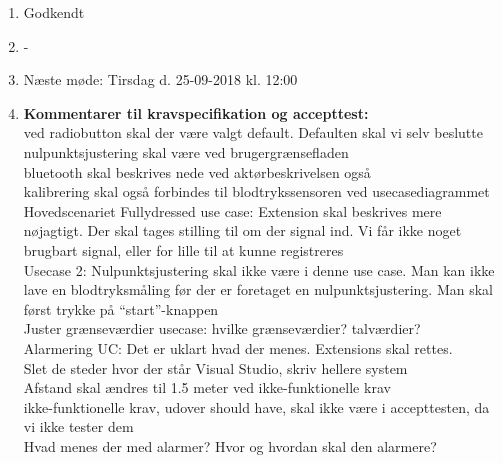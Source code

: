 \begin{enumerate}
	\item Godkendt \\
	\item - \\
	\item Næste møde: Tirsdag d. 25-09-2018 kl. 12:00 \\ 
	\item \textbf{Kommentarer til kravspecifikation og accepttest:} \\ ved radiobutton skal der være valgt default. Defaulten skal vi selv beslutte
	nulpunktsjustering skal være ved brugergrænsefladen \\ bluetooth skal beskrives nede ved aktørbeskrivelsen også \\
	kalibrering skal også forbindes til blodtrykssensoren ved usecasediagrammet \\
	Hovedscenariet Fullydressed use case: Extension skal beskrives mere nøjagtigt. Der skal tages stilling til om der signal ind. Vi får ikke noget brugbart signal, eller for lille til at kunne registreres \\
	Usecase 2: Nulpunktsjustering skal ikke være i denne use case. Man kan ikke lave en blodtryksmåling før der er foretaget en nulpunktsjustering. Man skal først trykke på “start”-knappen \\
	Juster grænseværdier usecase: hvilke grænseværdier? talværdier? \\
	Alarmering UC: Det er uklart hvad der menes. Extensions skal rettes. \\
	Slet de steder hvor der står Visual Studio, skriv hellere system \\
	Afstand skal ændres til 1.5 meter ved ikke-funktionelle krav \\
	ikke-funktionelle krav, udover should have, skal ikke være i accepttesten, da vi ikke tester dem \\
	Hvad menes der med alarmer? Hvor og hvordan skal den alarmere?
	
\end{enumerate}

\clearpage